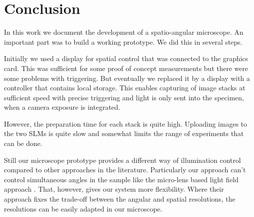 \chapter{Conclusion}
In this work we document the development of a spatio-angular
microscope. An important part was to build a working prototype. We did
this in several steps.


Initially we used a display for spatial control that was connected to
the graphics card. This was sufficient for some proof of concept
measurements but there were some problems with triggering.  But
eventually we replaced it by a display with a controller that contains
local storage. This enables capturing of image stacks at sufficient
speed with precise triggering and light is only sent into the
specimen, when a camera exposure is integrated.

However, the preparation time for each stack is quite high.  Uploading
images to the two SLMs is quite slow and somewhat limits the range of
experiments that can be done.

Still our microscope prototype provides a different way of
illumination control compared to other approaches in the
literature. Particularly our approach can't control simultaneous
angles in the sample like the micro-lens based light field approach
\citep{Levoy2009}. That, however, gives our system more
flexibility. Where their approach fixes the trade-off between the
angular and spatial resolutions, the resolutions can be easily adapted
in our microscope.
